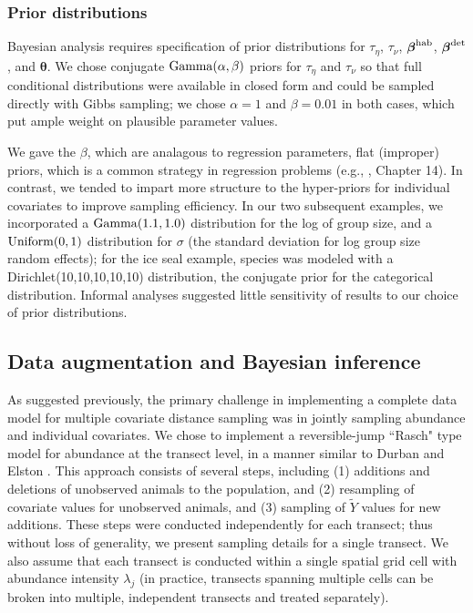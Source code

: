 \documentclass[10pt]{article}
\begin{document}
\subsubsection*{Prior distributions}

Bayesian analysis requires specification of prior distributions for $\tau_\eta$, $\tau_\nu$, $\boldsymbol{\beta}^{\rm hab}$, $\boldsymbol{\beta}^{\rm det}$, and $\boldsymbol{\theta}$.  We chose conjugate ${\rm Gamma}(\alpha,\beta)$ priors for $\tau_\eta$ and $\tau_\nu$ so that full conditional distributions were available in closed form and could be sampled directly with Gibbs sampling; we chose $\alpha=1$ and $\beta=0.01$ in both cases, which put ample weight on plausible parameter values.

We gave the $\beta$, which are analagous to regression parameters, flat (improper) priors, which is a common strategy in regression problems (e.g., \cite{GelmanEtAl2004}, Chapter 14).  In contrast, we tended to impart more structure to the hyper-priors for individual covariates to improve sampling efficiency.  In our two subsequent examples, we incorporated a ${\rm Gamma}(1.1,1.0)$ distribution for the log of group size, and a ${\rm Uniform}(0,1)$ distribution for $\sigma$ (the standard deviation for log group size random effects); for the ice seal example, species was modeled with a Dirichlet(10,10,10,10,10) distribution, the conjugate prior for the categorical distribution.  Informal analyses suggested little sensitivity of results to our choice of prior distributions.

\subsection*{Data augmentation and Bayesian inference}

As suggested previously, the primary challenge in implementing a complete data model for multiple covariate distance sampling was in jointly sampling abundance and individual covariates.  We chose to implement a reversible-jump ``Rasch" type model for abundance at the transect level, in a manner similar to Durban and Elston \cite{DurbanElston2005}.  This approach consists of several steps, including (1) additions and deletions of unobserved animals to the population, and (2) resampling of covariate values for unobserved animals, and (3) sampling of $\tilde{Y}$ values for new additions. These steps were conducted independently for each transect; thus without loss of generality, we present sampling details for a single transect. We also assume that each transect is conducted within a single spatial grid cell with abundance intensity $\lambda_j$ (in practice, transects spanning multiple cells can be broken into multiple, independent transects and treated separately).
\end{document}
